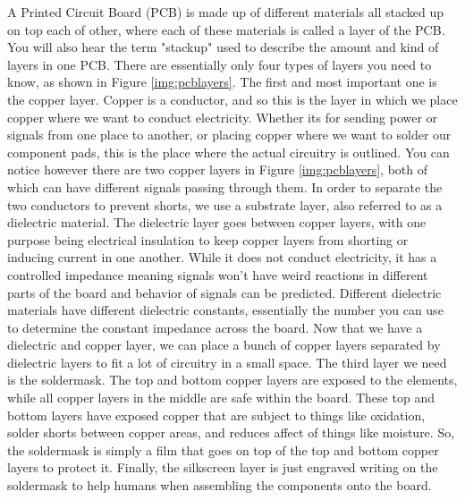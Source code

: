 A Printed Circuit Board (PCB) is made up of different materials all stacked up on top each of other, where each of these materials is called
a layer of the PCB. You will also hear the term "stackup" used to describe the amount and kind of layers in one PCB. There are essentially
only four types of layers you need to know, as shown in Figure \ref{img:pcblayers}. The first and most important one is the copper layer.
Copper is a conductor, and so this is the layer in which we place copper where we want to conduct electricity. Whether its for sending power or
signals from one place to another, or placing copper where we want to solder our component pads, this is the place where the actual circuitry is outlined.
You can notice however there are two copper layers in Figure \ref{img:pcblayers}, both of which can have different signals passing through them.
In order to separate the two conductors to prevent shorts, we use a substrate layer, also referred to as a dielectric material. The dielectric
layer goes between copper layers, with one purpose being electrical insulation to keep copper layers from shorting or inducing current in
one another. While it does not conduct electricity, it has a controlled impedance meaning signals won't have weird reactions in different
parts of the board and behavior of signals can be predicted. Different dielectric materials have different dielectric constants, essentially
the number you can use to determine the constant impedance across the board. Now that we have a dielectric and copper layer, we can place a bunch
of copper layers separated by dielectric layers to fit a lot of circuitry in a small space. The third layer we need is the soldermask. The top
and bottom copper layers are exposed to the elements, while all copper layers in the middle are safe within the board. These top and bottom layers
have exposed copper that are subject to things like oxidation, solder shorts between copper areas, and reduces affect of things like moisture.
So, the soldermask is simply a film that goes on top of the top and bottom copper layers to protect it. Finally, the silkscreen layer is just
engraved writing on the soldermask to help humans when assembling the components onto the board. 

